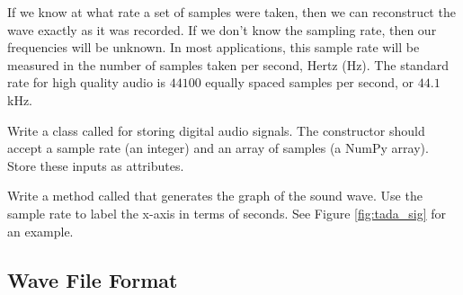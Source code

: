 If we know at what rate a set of samples were taken, then we can reconstruct the wave exactly as it was recorded.
If we don't know the sampling rate, then our frequencies will be unknown.
In most applications, this sample rate will be measured in the number of samples taken per second, Hertz (Hz).
The standard rate for high quality audio is $44100$ equally spaced samples per second, or $44.1$ kHz.

\begin{problem}
Write a class called  for storing digital audio signals.
The constructor should accept a sample rate (an integer) and an array of samples (a NumPy array).
Store these inputs as attributes.

Write a method called  that generates the graph of the sound wave.
Use the sample rate to label the x-axis in terms of seconds.
See Figure \ref{fig:tada_sig} for an example.

\end{problem}

\subsection*{Wave File Format} %

